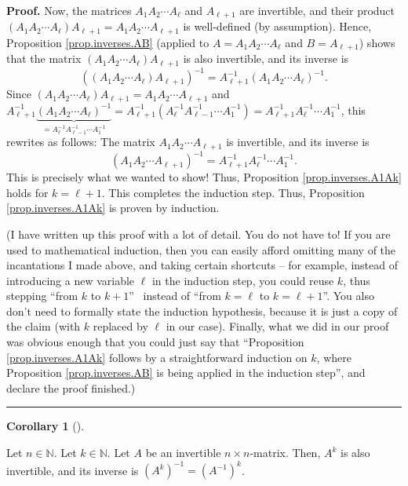 \documentclass[numbers=enddot,12pt,final,onecolumn,notitlepage]{scrartcl}%
\theoremstyle{definition}
\newtheorem{coro}[theo]{Corollary}
\newenvironment{corollary}[1][]
{\begin{coro}[#1]\begin{leftbar}}
{\end{leftbar}\end{coro}}
\newenvironment{proof}[1][Proof]{\noindent\textbf{#1.} }{\ \rule{0.5em}{0.5em}}
\begin{document}
\begin{proof}
Now, the matrices $A_{1}A_{2}\cdots A_{\ell}$ and $A_{\ell+1}$ are invertible,
and their product \newline$\left(  A_{1}A_{2}\cdots A_{\ell}\right)
A_{\ell+1}=A_{1}A_{2}\cdots A_{\ell+1}$ is well-defined (by assumption).
Hence, Proposition \ref{prop.inverses.AB} (applied to $A=A_{1}A_{2}\cdots
A_{\ell}$ and $B=A_{\ell+1}$) shows that the matrix $\left(  A_{1}A_{2}\cdots
A_{\ell}\right)  A_{\ell+1}$ is also invertible, and its inverse is
\[
\left(  \left(  A_{1}A_{2}\cdots A_{\ell}\right)  A_{\ell+1}\right)
^{-1}=A_{\ell+1}^{-1}\left(  A_{1}A_{2}\cdots A_{\ell}\right)  ^{-1}.
\]
Since $\left(  A_{1}A_{2}\cdots A_{\ell}\right)  A_{\ell+1}=A_{1}A_{2}\cdots
A_{\ell+1}$ and \newline$A_{\ell+1}^{-1}\underbrace{\left(  A_{1}A_{2}\cdots
A_{\ell}\right)  ^{-1}}_{=A_{\ell}^{-1}A_{\ell-1}^{-1}\cdots A_{1}^{-1}%
}=A_{\ell+1}^{-1}\left(  A_{\ell}^{-1}A_{\ell-1}^{-1}\cdots A_{1}^{-1}\right)
=A_{\ell+1}^{-1}A_{\ell}^{-1}\cdots A_{1}^{-1}$, this rewrites as follows: The
matrix $A_{1}A_{2}\cdots A_{\ell+1}$ is invertible, and its inverse is
\[
\left(  A_{1}A_{2}\cdots A_{\ell+1}\right)  ^{-1}=A_{\ell+1}^{-1}A_{\ell}%
^{-1}\cdots A_{1}^{-1}.
\]
This is precisely what we wanted to show! Thus, Proposition
\ref{prop.inverses.A1Ak} holds for $k=\ell+1$. This completes the induction
step. Thus, Proposition \ref{prop.inverses.A1Ak} is proven by induction.

(I have written up this proof with a lot of detail. You do not have to! If you
are used to mathematical induction, then you can easily afford omitting many
of the incantations I made above, and taking certain shortcuts -- for example,
instead of introducing a new variable $\ell$ in the induction step, you could
reuse $k$, thus stepping \textquotedblleft from $k$ to $k+1$\textquotedblright%
\ instead of \textquotedblleft from $k=\ell$ to $k=\ell+1$\textquotedblright.
You also don't need to formally state the induction hypothesis, because it is
just a copy of the claim (with $k$ replaced by $\ell$ in our case). Finally,
what we did in our proof was obvious enough that you could just say that
\textquotedblleft Proposition \ref{prop.inverses.A1Ak} follows by a
straightforward induction on $k$, where Proposition \ref{prop.inverses.AB} is
being applied in the induction step\textquotedblright, and declare the proof finished.)
\end{proof}

\begin{corollary}
\label{cor.inverses.Ak-1}Let $n\in\mathbb{N}$. Let $k\in\mathbb{N}$. Let $A$
be an invertible $n\times n$-matrix. Then, $A^{k}$ is also invertible, and its
inverse is $\left(  A^{k}\right)  ^{-1}=\left(  A^{-1}\right)  ^{k}$.
\end{corollary}
\end{document}
